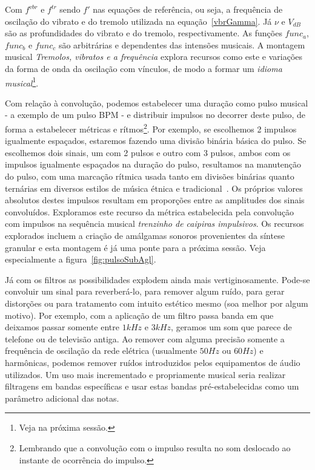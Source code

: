 Com $f^{vbr}$ e $f^{tr}$ sendo $f'$ nas equações de referência, ou seja, a frequência
de oscilação do vibrato e do tremolo utilizada na equação~\ref{vbrGamma}. Já $\nu$ e $V_{dB}$ são as profundidades
do vibrato e do tremolo, respectivamente. As funções $func_a$,
$func_b$ e $func_c$ são arbitrárias e dependentes das intensões musicais. A montagem musical 
\emph{Tremolos, vibratos e a frequência} explora
recursos como este e variações da forma de onda da oscilação com vínculos, de modo a formar um \emph{idioma musical}\footnote{Veja na próxima sessão.}.


Com relação à convolução, podemos estabelecer uma duração como pulso musical - a exemplo de um pulso BPM - 
e distribuir impulsos no decorrer deste pulso, de forma a estabelecer métricas e rítmos\footnote{Lembrando
que a convolução com o impulso resulta no som deslocado ao instante de ocorrência do impulso.}.
Por exemplo, se escolhemos 2 impulsos igualmente espaçados, estaremos fazendo uma
divisão binária básica do pulso. Se escolhemos dois sinais, um com 2 pulsos e outro com 3 pulsos,
ambos com os impulsos igualmente espaçados na duração do pulso, resultamos na manutenção
do pulso, com uma marcação rítmica usada tanto em divisões binárias quanto ternárias em diversos
estilos de música étnica e tradicional~\cite{Gramani}. 
Os próprios valores absolutos destes impulsos resultam em proporções entre as amplitudes dos sinais
convoluídos.
Exploramos este recurso da métrica
estabelecida pela convolução com impulsos na sequência musical \emph{trenzinho de caipiras impulsivos}. Os recursos explorados incluem a criação de amálgamas sonoros provenientes da síntese granular e esta montagem é já uma ponte para a próxima sessão. Veja especialmente a figura~\ref{fig:pulsoSubAgl}.

Já com os filtros as possibilidades explodem ainda mais vertiginosamente. Pode-se convoluir um sinal para reverberá-lo, para
remover algum ruído, para gerar distorções ou para tratamento com intuito estético mesmo (soa melhor por algum motivo). Por exemplo,
com a aplicação de um filtro passa banda em que deixamos passar somente entre $1kHz$ e $3kHz$, geramos um som
que parece de telefone ou de televisão antiga. Ao remover com alguma precisão somente
a frequência de oscilação da rede elétrica (usualmente $50Hz$ ou $60Hz$) e harmônicas, podemos remover
ruídos introduzidos pelos equipamentos de áudio utilizados. Um uso mais incrementado
e propriamente musical seria realizar filtragens em bandas específicas e usar estas bandas
pré-estabelecidas como um parâmetro adicional das notas.

